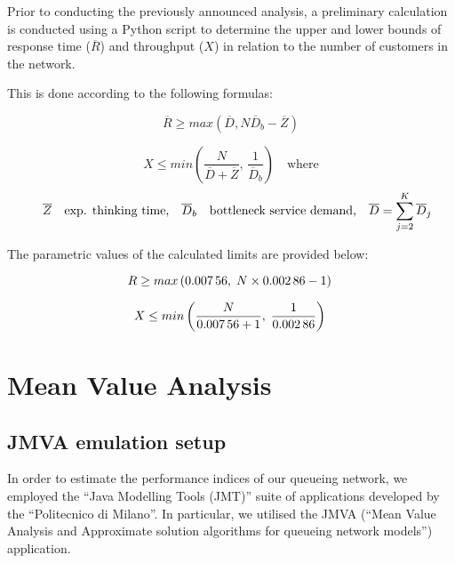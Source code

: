 Prior to conducting the previously announced analysis, a preliminary calculation is conducted using a Python script to determine the upper and lower bounds of response time ($\overline{R}$) and throughput ($X$) in relation to the number of customers in the network.

This is done according to the following formulas:

\label{eq:asymptotic-bounds-expected-response-time}
\begin{equation}
	\overline{R} \geq max\left(\overline{D},N\overline{D}_b-\overline{Z}\right)
\end{equation}

\label{eq:asymptotic-bounds-throughput}
\begin{equation}
	X \leq min\left(\frac{N}{\overline{D}+\overline{Z}},\,\frac{1}{\overline{D}_b}\right) \quad \text{where}
\end{equation}
\[
	\quad \overline{Z} \quad \text{exp. thinking time,} \quad \overline{D}_b \quad \text{bottleneck service demand,} \quad \overline{D} = \sum^{K}_{j=2}\overline{D}_{j}  \\
\]

The parametric values of the calculated limits are provided below:

\[
 R \geq max\left(\num[round-mode=places, round-precision=5]{0.00756138888888889},\;N\times\num[round-mode=places, round-precision=5]{0.00286250000000000}-1\right) \\
\]

\[
 X \leq min\left(\frac{N}{\num[round-mode=places, round-precision=5]{0.00756138888888889}+1},\;\frac{1}{\num[round-mode=places, round-precision=5]{0.00286250000000000}}\right) \\
\]

\section{Mean Value Analysis}

\subsection{JMVA emulation setup}

In order to estimate the performance indices of our queueing network, we employed the ``Java Modelling Tools (JMT)'' suite of applications developed by the ``Politecnico di Milano''.
In particular, we utilised the JMVA (``Mean Value Analysis and Approximate solution algorithms for queueing network models'') application.

